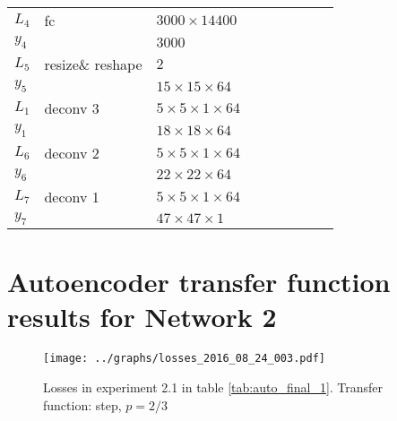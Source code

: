 \begin{table}[h!]
{\begin{tabular}{|lllllllll|}
\multicolumn{1}{|l|}{$L_4$}   & fc       & \multicolumn{1}{l|}{$3000\times 14400$}              &          & \multicolumn{1}{l|}{}        \\
\multicolumn{1}{|l|}{$y_4$}   &          & \multicolumn{1}{l|}{$3000$}                         &          & \multicolumn{1}{l|}{}        \\ \hline

\multicolumn{1}{|l|}{$L_5$}   & resize\& reshape & \multicolumn{1}{l|}{$2$}                    &          & \multicolumn{1}{l|}{}        \\
\multicolumn{1}{|l|}{$y_5$}   &          & \multicolumn{1}{l|}{$15\times15\times 64$}          &          & \multicolumn{1}{l|}{}        \\ \hline

\multicolumn{1}{|l|}{$L_1$}   & deconv 3   & \multicolumn{1}{l|}{$5\times 5\times1\times 64$}    &          & \multicolumn{1}{l|}{}\\
\multicolumn{1}{|l|}{$y_1$}   &          & \multicolumn{1}{l|}{$18\times18\times64$}           &          & \multicolumn{1}{l|}{}        \\ \hline

\multicolumn{1}{|l|}{$L_6$}   & deconv 2   & \multicolumn{1}{l|}{$5\times 5\times1\times 64$}    &          & \multicolumn{1}{l|}{}\\
\multicolumn{1}{|l|}{$y_6$}   &          & \multicolumn{1}{l|}{$22\times22\times64$}           &          & \multicolumn{1}{l|}{}        \\ \hline


\multicolumn{1}{|l|}{$L_7$}   & deconv 1   & \multicolumn{1}{l|}{$5\times 5\times1\times 64$}    &          & \multicolumn{1}{l|}{}\\
\multicolumn{1}{|l|}{$y_7$}   &          & \multicolumn{1}{l|}{$47\times47\times1$}           &          & \multicolumn{1}{l|}{}        \\ \hline
\end{tabular}
\caption{} \label{net:2}
}
\end{table}

\chapter{Autoencoder transfer function results for Network 2} \label{appendix2}


      \begin{figure}[!h]
      \centering
      \texttt{[image: ../graphs/losses\_2016\_08\_24\_003.pdf]}
      \caption{Losses in experiment 2.1 in table \ref{tab:auto_final_1}. Transfer function: step, $p=2/3$}
      \label{fig:alternate}
      \end{figure}

